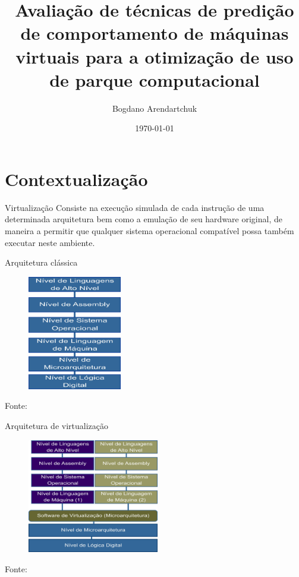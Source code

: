 \documentclass{beamer}
\institute{Universidade Tuiuti do Paraná}
\author{Bogdano Arendartchuk}
\title{Avaliação de técnicas de predição de comportamento de máquinas
virtuais para a otimização de uso de parque computacional}
\date{\today}
\begin{document}
\frame{\titlepage}

\section{Contextualização}
\begin{frame}
\begin{block}{Virtualização}
Consiste na execução simulada de cada instrução de uma determinada
arquitetura bem como a emulação de seu hardware original, de maneira a
permitir que qualquer sistema operacional compatível possa também executar
neste ambiente.\cite{goldberg1974survey}
\end{block}
\end{frame}

\begin{frame}{Arquitetura clássica}
\begin{figure}
\centering
\includegraphics[height=5cm]{img-dutra2009-clas.png}
\end{figure}
\tiny{Fonte: \cite{dutra2009a}}
\end{frame}

\begin{frame}{Arquitetura de virtualização}
\begin{figure}
\centering
\includegraphics[height=5cm]{img-dutra2009-virt.png}
\end{figure}
\tiny{Fonte: \cite{dutra2009a}}
\end{frame}
\end{document}
